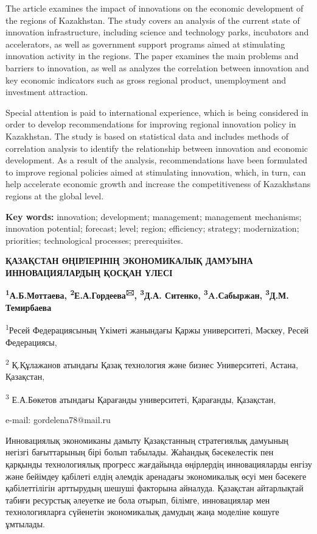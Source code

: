 The article examines the impact of innovations on the economic
development of the regions of Kazakhstan. The study covers an analysis
of the current state of innovation infrastructure, including science and
technology parks, incubators and accelerators, as well as government
support programs aimed at stimulating innovation activity in the
regions. The paper examines the main problems and barriers to
innovation, as well as analyzes the correlation between innovation and
key economic indicators such as gross regional product, unemployment and
investment attraction.

Special attention is paid to international experience, which is being
considered in order to develop recommendations for improving regional
innovation policy in Kazakhstan. The study is based on statistical data
and includes methods of correlation analysis to identify the
relationship between innovation and economic development. As a result of
the analysis, recommendations have been formulated to improve regional
policies aimed at stimulating innovation, which, in turn, can help
accelerate economic growth and increase the competitiveness of
Kazakhstan\textquotesingle s regions at the global level.

{\bfseries Key words:} innovation; development; management; management
mechanisms; innovation potential; forecast; level; region; efficiency;
strategy; modernization; priorities; technological processes;
prerequisites.

{\bfseries ҚАЗАҚСТАН ӨҢІРЛЕРІНІҢ ЭКОНОМИКАЛЫҚ ДАМУЫНА ИННОВАЦИЯЛАРДЫҢ
ҚОСҚАН ҮЛЕСІ}

{\bfseries \textsuperscript{1}А.Б.Моттаева,
\textsuperscript{2}Е.А.Гордеева\textsuperscript{🖂},
\textsuperscript{3}Д.А. Ситенко, \textsuperscript{3}A.Сабыржан,
\textsuperscript{3}Д.М.} {\bfseries Темирбаева}

\textsuperscript{1}Ресей Федерациясының Үкіметі жанындағы Қаржы
университеті, Мәскеу, Ресей Федерациясы,

\textsuperscript{2} Қ.Құлажанов атындағы Қазақ технология және бизнес
Университеті, Астана, Қазақстан,

\textsuperscript{3} Е.А.Бөкетов атындағы Қарағанды университеті,
Қарағанды, Қазақстан,

e-mail: gordelena78@mail.ru

Инновациялық экономиканы дамыту Қазақстанның стратегиялық дамуының
негізгі бағыттарының бірі болып табылады. Жаһандық бәсекелестік пен
қарқынды технологиялық прогресс жағдайында өңірлердің инновацияларды
енгізу және бейімдеу қабілеті елдің әлемдік аренадағы экономикалық өсуі
мен бәсекеге қабілеттілігін арттырудың шешуші факторына айналуда.
Қазақстан айтарлықтай табиғи ресурстық әлеуетке ие бола отырып, білімге,
инновациялар мен технологияларға сүйенетін экономикалық дамудың жаңа
моделіне көшуге ұмтылады.

